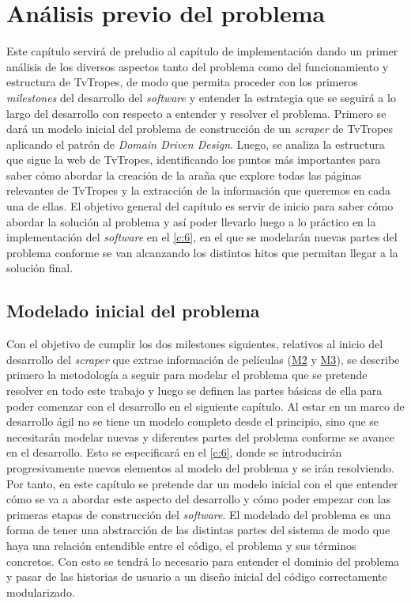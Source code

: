 \chapter{Análisis previo del problema}
Este capítulo servirá de preludio al capítulo de implementación dando un primer
análisis de los diversos aspectos tanto del problema como del funcionamiento y
estructura de TvTropes, de modo que permita proceder con los primeros
\textit{milestones} del desarrollo del \textit{software} y entender la
estrategia que se seguirá a lo largo del desarrollo con respecto a entender y
resolver el problema. Primero se dará un modelo inicial del problema de
construcción de un \textit{scraper} de TvTropes aplicando el patrón de
\textit{Domain Driven Design}. Luego, se analiza la estructura que sigue la web
de TvTropes, identificando los puntos más importantes para saber cómo abordar la
creación de la araña que explore todas las páginas relevantes de TvTropes y la
extracción de la información que queremos en cada una de ellas. El objetivo
general del capítulo es servir de inicio para saber cómo abordar la solución al
problema y así poder llevarlo luego a lo práctico en la implementación del
\textit{software} en el \autoref{c:6}, en el que se modelarán nuevas partes del
problema conforme se van alcanzando los distintos hitos que permitan llegar a la
solución final.

\section{Modelado inicial del problema}
Con el objetivo de cumplir los dos milestones siguientes, relativos al inicio
del desarrollo del \textit{scraper} que extrae información de películas
(\href{https://github.com/jlgallego99/TropesToGo/milestone/3}{M2} y
\href{https://github.com/jlgallego99/TropesToGo/milestone/7}{M3}), se describe
primero la metodología a seguir para modelar el problema que se pretende
resolver en todo este trabajo y luego se definen las partes básicas de ella para
poder comenzar con el desarrollo en el siguiente capítulo. Al estar en un marco
de desarrollo ágil no se tiene un modelo completo desde el principio, sino que
se necesitarán modelar nuevas y diferentes partes del problema conforme se
avance en el desarrollo. Esto se especificará en el \ref{c:6}, donde se
introducirán progresivamente nuevos elementos al modelo del problema y se irán
resolviendo. Por tanto, en este capítulo se pretende dar un modelo inicial con
el que entender cómo se va a abordar este aspecto del desarrollo y cómo poder
empezar con las primeras etapas de construcción del \textit{software}. El
modelado del problema es una forma de tener una abstracción de las distintas
partes del sistema de modo que haya una relación entendible entre el código, el
problema y sus términos concretos. Con esto se tendrá lo necesario para entender
el dominio del problema y pasar de las historias de usuario a un diseño inicial
del código correctamente modularizado.


